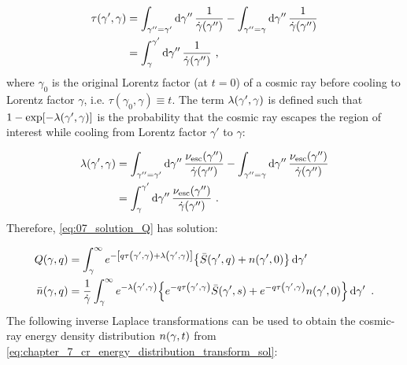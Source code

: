 \begin{equation}
    \begin{aligned}
    \tau\qty(\gamma', \gamma) &= \int_{\gamma''=\gamma'} \dd{\gamma''}\frac{1}{\dot{\gamma}\qty(\gamma'')} - \int_{\gamma''=\gamma} \dd{\gamma''}\frac{1}{\dot{\gamma}\qty(\gamma'')}\\
    &=\int_\gamma^{\gamma'}\dd{\gamma''}\frac{1}{\dot{\gamma}\qty(\gamma'')}\text{ ,}
    \end{aligned} \label{eq:chapter_7_cooling_time}
\end{equation}
\noindent where $\gamma_0$ is the original Lorentz factor (at $t=0$) of a cosmic ray before cooling to Lorentz factor $\gamma$, i.e. $\tau(\gamma_0,\gamma)\equiv t$. The term $\lambda\qty(\gamma',\gamma)$ is defined such that $1-\exp[-\lambda\qty(\gamma',\gamma)]$ is the probability that the cosmic ray escapes the region of interest while cooling from Lorentz factor $\gamma'$ to $\gamma$:

\begin{equation}
    \begin{aligned}
    \lambda\qty(\gamma',\gamma)&=\int_{\gamma''=\gamma'}\dd{\gamma''}\frac{\nu_\text{esc}\qty(\gamma'')}{\dot{\gamma}\qty(\gamma'')}-\int_{\gamma''=\gamma}\dd{\gamma''}\frac{\nu_\text{esc}\qty(\gamma'')}{\dot{\gamma}\qty(\gamma'')} \\
    &=\int_\gamma^{\gamma'}\dd{\gamma''}\frac{\nu_\text{esc}\qty(\gamma'')}{\dot{\gamma}\qty(\gamma'')}\text{ .}
    \end{aligned} \label{eq:chapter_7_lambda_escape_rate}
\end{equation}
\noindent Therefore, \autoref{eq:07_solution_Q} has solution:

\begin{equation}
    \begin{aligned}
        Q\qty(\gamma,q)&=\int_\gamma^\infty e^{-\qty[q\tau\qty(\gamma',\gamma)+\lambda\qty(\gamma',\gamma)]}\qty{\bar{S}\qty(\gamma',q)+n\qty(\gamma',0)}\dd{\gamma'} \\
        \bar{n}\qty(\gamma,q) &=\frac{1}{\dot{\gamma}}\int_\gamma^\infty e^{-\lambda\qty(\gamma',\gamma)} \qty{e^{-q\tau\qty(\gamma',\gamma)}\bar{S}\qty(\gamma',s)+e^{-q\tau\qty(\gamma',\gamma)}n\qty(\gamma',0)}\dd{\gamma'}\text{ .}
    \end{aligned} \label{eq:chapter_7_cr_energy_distribution_transform_sol}
\end{equation}
\noindent The following inverse Laplace transformations can be used to obtain the cosmic-ray energy density distribution $n\qty(\gamma,t)$ from \autoref{eq:chapter_7_cr_energy_distribution_transform_sol}:

